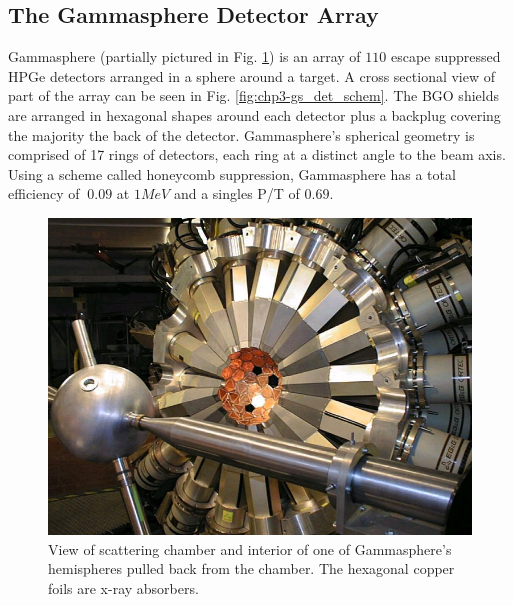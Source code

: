 \subsection{The Gammasphere Detector Array}
\label{ssec:exp-pr-gamma-gammasphere}
Gammasphere (partially pictured in Fig. \ref{fig:chp3-gs-hemisphere}) is an array of $110$ escape suppressed HPGe detectors arranged in a sphere around a target. A cross sectional view of part of the array can be seen in Fig. \ref{fig:chp3-gs_det_schem}. The BGO shields are arranged in hexagonal shapes around each detector plus a backplug covering the majority the back of the detector. Gammasphere's spherical geometry is comprised of 17 rings of detectors, each ring at a distinct angle to the beam axis. Using a scheme called honeycomb suppression, Gammasphere has a total efficiency of $~0.09$ at $1MeV$ and a singles P/T of $0.69$.

\begin{figure}[h]
	\centerline{\includegraphics[height=0.3\textheight]{./img/c3/gammasphere_hemi.jpg}}
	\caption{View of scattering chamber and interior of one of Gammasphere's hemispheres pulled back from the chamber. The hexagonal copper foils are x-ray absorbers.}
	\label{fig:chp3-gs-hemisphere}
\end{figure}

